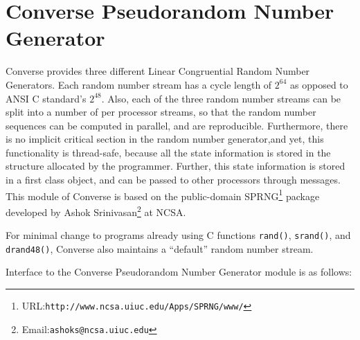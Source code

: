 \chapter{Converse Pseudorandom Number Generator}

Converse provides three different Linear Congruential Random Number Generators.
Each random number stream has a cycle length of $2^{64}$ as opposed to
ANSI C standard's $2^{48}$.
Also, each of the three random number streams can be split into a number of
per processor streams, so that the random number sequences can be computed 
in parallel, and are reproducible. Furthermore, there is no implicit critical
section in the random number generator,and yet, this functionality is
thread-safe, because all the state information is stored in the structure
allocated by the programmer. Further, this state information is stored in a
first class object, and can be passed to other processors through messages.
This module of Converse is based on the public-domain 
SPRNG\footnote{URL:{\tt http://www.ncsa.uiuc.edu/Apps/SPRNG/www/}} 
package developed
by Ashok Srinivasan\footnote{Email:{\tt ashoks@ncsa.uiuc.edu}} at NCSA.

For minimal change to programs already using C functions {\tt rand()},
{\tt srand()}, and {\tt drand48()}, Converse also maintains a ``default''
random number stream.

Interface to the Converse Pseudorandom Number Generator module is as follows:





\desc{}


